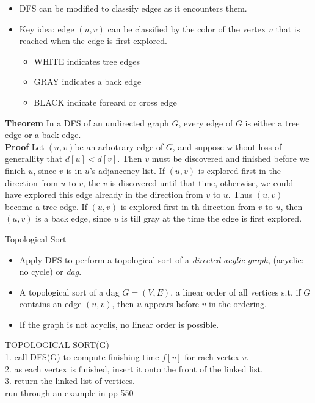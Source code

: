 \documentclass{beamer}
\begin{document}
\begin{frame}{}

\begin{itemize}
\item DFS can be modified to classify edges as it encounters them.  
\item Key idea: edge $(u,v)$ can be classified by the color of the vertex
 $v$ that is reached when the edge is first explored.  
\begin{small}
\begin{itemize}
\item WHITE indicates tree edges
\item GRAY indicates a back edge
\item BLACK  indicate foreard or cross edge
\end{itemize}
\end{small}
\end{itemize}
\end{frame}

\begin{frame}{}

{\bf Theorem} In a DFS of an undirected graph $G$, every edge of $G$
is either a tree edge or a back edge. \\ 
{\bf Proof} Let $(u,v)$be an arbotrary edge of $G$, and suppose without loss of
generallity that $d[u]<d[v]$.  Then $v$ must be discovered and finished
before we finieh $u$, since $v$ is in $u$'s adjancency list.  If $(u,v)$ is
explored first in the direction from $u$ to $v$, the $v$ is discovered
until that time, otherwise, we could have explored this edge already
in the direction from $v$ to $u$.  Thus $(u,v)$ become a tree edge.  
If $(u,v)$ is explored first in th direction from $v$ to $u$, then
$(u,v)$ is a back edge, since $u$ is till gray at the time the edge
is first explored.  
\end{frame}

\begin{frame}{}

\centerline{\large Topological Sort}
\begin{itemize}
\item Apply DFS to perform a topological sort of a {\it directed acylic graph},
 (acyclic: no cycle) or {\em dag}.  
\item A topological sort of a dag $G=(V,E)$, a linear order of all vertices
 s.t. if $G$ contains an edge $(u,v)$, then $u$ appears before $v$ in the
 ordering.  
\item If the graph is not acyclis, no linear order is possible.  
\end{itemize}
\end{frame}

\begin{frame}{}

TOPOLOGICAL-SORT(G) \\
1. call DFS(G) to compute finishing time $f[v]$ for rach vertex $v$. \\
2. as each vertex is finished, insert it onto the front of the linked list. \\
3. return the linked list of vertices.  \\
{\small run through an example in pp 550}
\end{frame}
\end{document}
